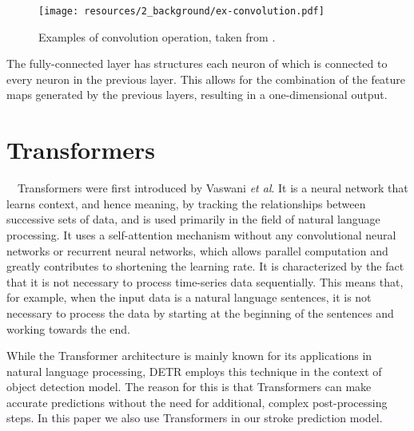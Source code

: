 \begin{figure}[p]
  \centering
  \texttt{[image: resources/2\_background/ex-convolution.pdf]}
  \caption{
    Examples of convolution operation,
    taken from \cite{yamashita2018convolutional}.
  }
  \label{convolution-process}
\end{figure}
\clearpage

The fully-connected layer has structures each neuron of which is connected 
to every neuron in the previous layer. This allows for the combination of 
the feature maps generated by the previous layers, resulting in a 
one-dimensional output.  

\section{Transformers}
　Transformers were first introduced by Vaswani \textit{et al}. \cite{vaswani2017attention}
It is a neural network that learns context, and hence meaning, by tracking the
relationships between successive sets of data, and is used primarily in the 
field of natural language processing. 
It uses a self-attention mechanism without any convolutional neural networks 
or recurrent neural networks, which allows parallel computation and greatly 
contributes to shortening the learning rate.
It is characterized by the fact that it is not necessary to process time-series 
data sequentially. This means that, for example, when the input data is a 
natural language sentences, it is not necessary to process the data by starting 
at the beginning of the sentences and working towards the end.

While the Transformer architecture is mainly known for its applications in 
natural language processing, DETR \cite{DBLP:journals/corr/abs-2005-12872} employs 
this technique in the context of object detection model. The reason for this is that 
Transformers can make accurate predictions without the need for additional, complex 
post-processing steps. In this paper we also use Transformers in our stroke prediction 
model.
